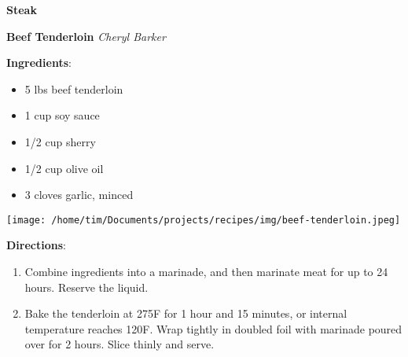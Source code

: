 \documentclass[11pt, twoside, openany]{book}
\begin{document}
{\newpage \LARGE \textbf{Steak}} \label{steak}\\
\noindent\begin{minipage}[t]{\linewidth}%
{\Large\textbf{Beef Tenderloin}} \label{beef-tenderloin}\hfill\textit{Cheryl Barker}\\
\noindent\begin{minipage}[t]{0.78\linewidth}%
\textbf{Ingredients}:\vspace{-3mm}
\begin{multicols}{2}
\begin{itemize}\setlength\itemsep{-1mm}
\item 5 lbs beef tenderloin
\item 1 cup soy sauce
\item 1/2 cup sherry
\item 1/2 cup olive oil
\item 3 cloves garlic, minced
\end{itemize}
\end{multicols}
\end{minipage}
\noindent\begin{minipage}[t]{0.18\linewidth}
\centering \strut\vspace*{-\baselineskip}\newline
\texttt{[image: /home/tim/Documents/projects/recipes/img/beef-tenderloin.jpeg]}\\
\end{minipage}\vspace{3mm}
\textbf{Directions}:
\vspace{-3mm}\begin{enumerate}\setlength\itemsep{-1mm}
\item Combine ingredients into a marinade, and then marinate meat for up to 24 hours. Reserve the liquid.
\item Bake the tenderloin at 275F for 1 hour and 15 minutes, or internal temperature reaches 120F. Wrap tightly in doubled foil with marinade poured over for 2 hours. Slice thinly and serve.
\end{enumerate}
\end{minipage}\vspace{8mm}
\end{document}
